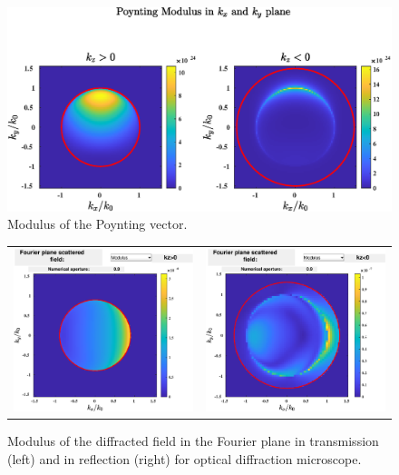 \begin{figure}[H]
\begin{center}
  \includegraphics*[width=15.0cm,draft=false]{test1poynting2d.eps}
\end{center}
\caption{Modulus of the Poynting vector.}
\end{figure}


\begin{figure}[H]
\begin{center}
\begin{tabular}{cc}
  \includegraphics*[width=7.0cm,draft=false]{test1fourierpos.eps}
&  \includegraphics*[width=7.0cm,draft=false]{test1fourierneg.eps}
\end{tabular}

\end{center}
\caption{Modulus of the diffracted field in the Fourier plane in
  transmission (left) and in reflection (right) for optical diffraction
  microscope.}
\end{figure}

